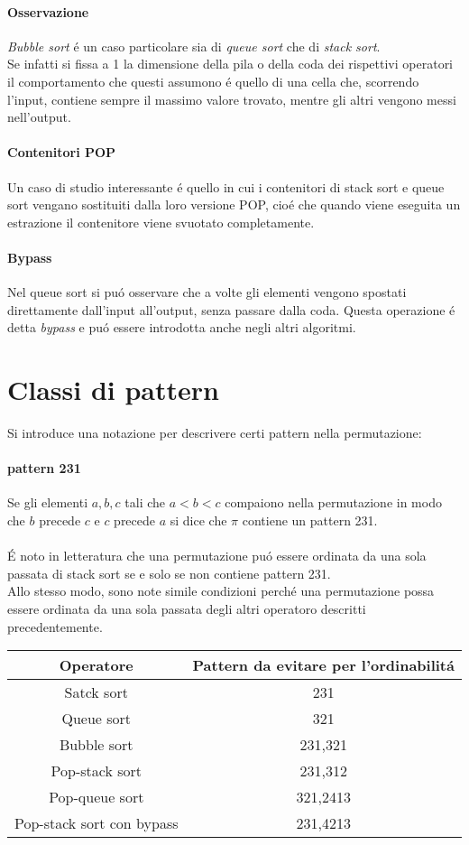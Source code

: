 \paragraph*{Osservazione}\textit{Bubble sort} \'e un caso particolare sia di \textit{queue sort} che di \textit{stack sort}.\\
Se infatti si fissa a 1 la dimensione della pila o della coda dei rispettivi operatori il comportamento che questi assumono \'e quello di una cella che, scorrendo l'input, contiene sempre il massimo valore trovato, mentre gli altri vengono messi nell'output.
\paragraph*{Contenitori POP}Un caso di studio interessante \'e quello in cui i contenitori di stack sort e queue sort vengano sostituiti dalla loro versione POP, cio\'e che quando viene eseguita un estrazione il contenitore viene svuotato completamente. 
\paragraph*{Bypass}Nel queue sort si pu\'o osservare che a volte gli elementi vengono spostati direttamente dall'input all'output, senza passare dalla coda. Questa operazione \'e detta \textit{bypass} e pu\'o essere introdotta anche negli altri algoritmi.
\section*{Classi di pattern}
Si introduce una notazione per descrivere certi pattern nella permutazione:
\paragraph*{pattern 231}Se gli elementi ${a,b,c}$ tali che $a<b<c$ compaiono nella permutazione in modo che $b$ precede $c$ e $c$ precede $a$ si dice che $\pi$ contiene un pattern 231.\\\\
\'E noto in letteratura che una permutazione pu\'o essere ordinata da una sola passata di stack sort se e solo se non contiene pattern 231.\\
Allo stesso modo, sono note simile condizioni perch\'e una permutazione possa essere ordinata da una sola passata degli altri operatoro descritti precedentemente.
\begin{center}
\begin{tabular}{ |c|c| } 
\hline
\textbf{Operatore} & \textbf{Pattern da evitare per l'ordinabilit\'a} \\ 
\hline
Satck sort & 231\\ 
Queue sort & 321 \\ 
Bubble sort & 231,321 \\ 
Pop-stack sort & 231,312\\ 
Pop-queue sort& 321,2413\\ 
Pop-stack sort con bypass &231,4213 \\ 
\hline
\end{tabular}
\end{center}
